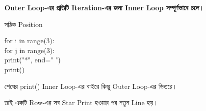 \begin{rememberbox}

\begin{center}

\textbf{Outer Loop-এর প্রতিটি Iteration-এর জন্য
Inner Loop সম্পূর্ণভাবে চলে।}

\end{center}

\end{rememberbox}



\begin{codeoutputbox}{সঠিক Position}

\noindent
\begin{minipage}[t]{0.53\linewidth}
\codeheading

\begin{english}
\ttfamily
for i in range(3):\\
\hspace*{4mm}for j in range(3):\\
\hspace*{8mm}print("*", end=" ")\\
\hspace*{4mm}print()
\end{english}

\end{minipage}
\hfill
\begin{minipage}[t]{0.43\linewidth}
\outputheading

শেষের
\textenglish{\ttfamily print()}
Inner Loop-এর বাইরে কিন্তু Outer Loop-এর ভিতরে।

তাই একটি Row-এর সব Star Print হওয়ার পর নতুন Line হয়।

\end{minipage}

\end{codeoutputbox}

